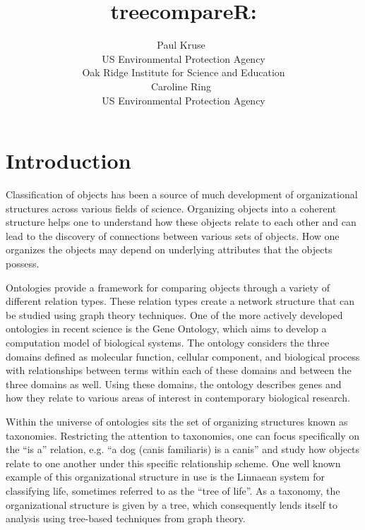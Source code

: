 \documentclass[article]{jss}
\author{Paul Kruse~\orcidlink{0000-0003-0918-3766}\\US Environmental Protection Agency\\ Oak Ridge Institute for Science and Education\\
   \And Caroline Ring~\orcidlink{0000-0002-0463-1251}\\US Environmental Protection Agency}
\title{treecompareR: }
\begin{document}


\section{Introduction} \label{sec:intro}

Classification of objects has been a source of much development of organizational structures across various fields of science. Organizing objects into a coherent structure helps one to understand how these objects relate to each other and can lead to the discovery of connections between various sets of objects. How one organizes the objects may depend on underlying attributes that the objects possess.

Ontologies provide a framework for comparing objects through a variety of different relation types. These relation types create a network structure that can be studied using graph theory techniques. One of the more actively developed ontologies in recent science is the Gene Ontology, which aims to develop a computation model of biological systems. The ontology considers the three domains defined as molecular function, cellular component, and biological process with relationships between terms within each of these domains and between the three domains as well. Using these domains, the ontology describes genes and how they relate to various areas of interest in contemporary biological research.

Within the universe of ontologies sits the set of organizing structures known as taxonomies. Restricting the attention to taxonomies, one can focus specifically on the “is a” relation, e.g. “a dog (canis familiaris) is a canis” and study how objects relate to one another under this specific relationship scheme. One well known example of this organizational structure in use is the Linnaean system for classifying life, sometimes referred to as the “tree of life”. As a taxonomy, the organizational structure is given by a tree, which consequently lends itself to analysis using tree-based techniques from graph theory.
\end{document}
